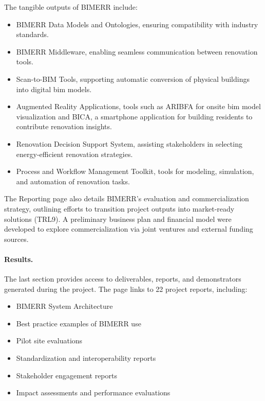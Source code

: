 The tangible outputs of BIMERR include:
\begin{itemize}
    \item BIMERR Data Models and Ontologies, ensuring compatibility with industry standards.
    \item BIMERR Middleware, enabling seamless communication between renovation tools.
    \item Scan-to-BIM Tools, supporting automatic conversion of physical buildings into digital \gls{bim} models.
    \item Augmented Reality Applications, tools such as ARIBFA for onsite \gls{bim} model visualization and BICA, a smartphone application for building residents to contribute renovation insights.
    \item Renovation Decision Support System, assisting stakeholders in selecting energy-efficient renovation strategies.
    \item Process and Workflow Management Toolkit, tools for modeling, simulation, and automation of renovation tasks.
\end{itemize}
	
The Reporting page also details BIMERR's evaluation and commercialization strategy, outlining efforts to transition project outputs into market-ready solutions (TRL9).
A preliminary business plan and financial model were developed to explore commercialization via joint ventures and external funding sources.

\paragraph*{Results.}
The last section provides access to deliverables, reports, and demonstrators generated during the project.
The page links to 22 project reports, including:
\begin{itemize}
    \item BIMERR System Architecture
    \item Best practice examples of BIMERR use
    \item Pilot site evaluations
    \item Standardization and interoperability reports
    \item Stakeholder engagement reports
    \item Impact assessments and performance evaluations
\end{itemize}


